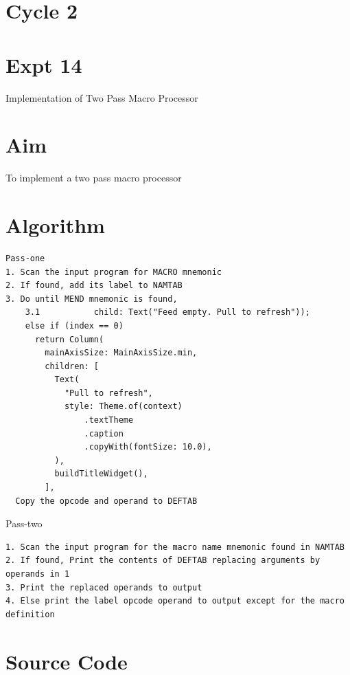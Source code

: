 \documentclass[13pt,oneside]{book}
\begin{document}
\section*{Cycle 2}
\section*{Expt 14}
\begin{center}
    \Large{Implementation of Two Pass Macro Processor}
\end{center}
\section*{Aim}
\large
To implement a two pass macro processor

\section*{Algorithm} 
    \begin{verbatim}
Pass-one
1. Scan the input program for MACRO mnemonic
2. If found, add its label to NAMTAB
3. Do until MEND mnemonic is found,
	3.1           child: Text("Feed empty. Pull to refresh"));
	else if (index == 0)
	  return Column(
		mainAxisSize: MainAxisSize.min,
		children: [
		  Text(
			"Pull to refresh",
			style: Theme.of(context)
				.textTheme
				.caption
				.copyWith(fontSize: 10.0),
		  ),
		  buildTitleWidget(),
		],
  Copy the opcode and operand to DEFTAB
	\end{verbatim}

Pass-two
\begin{verbatim}
1. Scan the input program for the macro name mnemonic found in NAMTAB
2. If found, Print the contents of DEFTAB replacing arguments by operands in 1
3. Print the replaced operands to output
4. Else print the label opcode operand to output except for the macro definition
\end{verbatim}

\section*{Source Code}
\small
\end{document}
